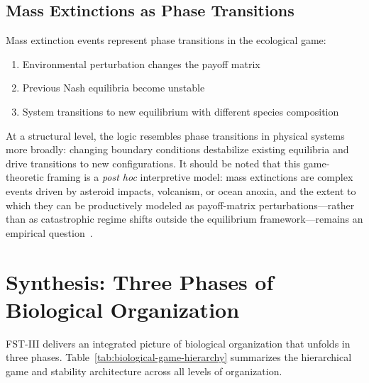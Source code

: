 \documentclass[12pt,a4paper]{article}
\theoremstyle{remark}
\begin{document}
\subsection{Mass Extinctions as Phase Transitions}

Mass extinction events represent phase transitions in the ecological game:
\begin{enumerate}
    \item Environmental perturbation changes the payoff matrix
    \item Previous Nash equilibria become unstable
    \item System transitions to new equilibrium with different species composition
\end{enumerate}

At a structural level, the logic resembles phase transitions in physical systems more broadly: changing boundary conditions destabilize existing equilibria and drive transitions to new configurations. It should be noted that this game-theoretic framing is a \emph{post hoc} interpretive model: mass extinctions are complex events driven by asteroid impacts, volcanism, or ocean anoxia, and the extent to which they can be productively modeled as payoff-matrix perturbations---rather than as catastrophic regime shifts outside the equilibrium framework---remains an empirical question~\citep{GouldEldredge1977}.

\section{Synthesis: Three Phases of Biological Organization}
\label{sec:synthesis}

FST-III delivers an integrated picture of biological organization that unfolds in three phases. Table~\ref{tab:biological-game-hierarchy} summarizes the hierarchical game and stability architecture across all levels of organization.
\end{document}
